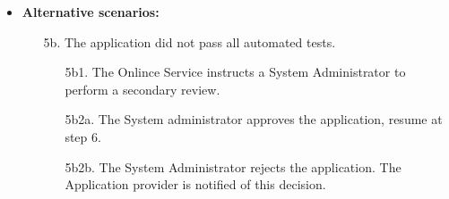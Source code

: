 \documentclass[english]{sareport}
\begin{document}
\begin{itemize}
    \item \textbf{Alternative scenarios:} 
    \begin{enumerate}
        \item [5b.] The application did not pass all automated tests.
	\begin{enumerate}
		\item [5b1.] The Onlince Service instructs a System Administrator to perform a secondary review.
		\item [5b2a.] The System administrator approves the application, resume at step 6.
		\item [5b2b.] The System Administrator rejects the application. The Application provider is notified of this decision.
	\end{enumerate}
    \end{enumerate}
\end{itemize}
\end{document}
